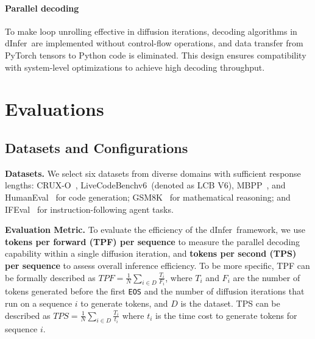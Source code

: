 \documentclass[]{antgroup}
\newcommand{\sys}{dInfer}
\begin{document}
\paragraph{Parallel decoding}
To make loop unrolling effective in diffusion iterations, decoding algorithms in \sys~are implemented without control-flow operations, and data transfer from PyTorch tensors to Python code is eliminated. This design ensures compatibility with system-level optimizations to achieve high decoding throughput.

\section{Evaluations} \label{sec:eval}

\subsection{Datasets and Configurations}

\textbf{Datasets.} We select six datasets from diverse domains with sufficient response lengths: CRUX-O~\citep{gu2024cruxeval}, LiveCodeBenchv6~\citep{jain2024livecodebench}(denoted as LCB V6), MBPP~\citep{austin2021program}, and HumanEval~\citep{chen2021evaluating} for code generation; GSM8K~\citep{cobbe2021training} for mathematical reasoning; and IFEval~\citep{zhou2023instruction} for instruction-following agent tasks.

\textbf{Evaluation Metric.} To evaluate the efficiency of the \sys~framework, we use \textbf{tokens per forward (TPF) per sequence} to measure the parallel decoding capability within a single diffusion iteration, and \textbf{tokens per second (TPS) per sequence} to assess overall inference efficiency.
To be more specific, 
TPF can be formally described as
$TPF=\frac{1}{N}\sum_{i \in D}\frac{T_i}{F_i}$, where $T_i$ and $F_i$ are the number of tokens generated before the first \texttt{EOS} and the number of diffusion iterations that run on a sequence $i$ to generate tokens, and $D$ is the dataset. TPS can be described as $TPS=\frac{1}{N}\sum_{i \in D}\frac{T_i}{t_i}$ where $t_i$ is the time cost to generate tokens for sequence $i$.

\end{document}
